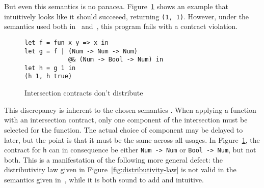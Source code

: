 \documentclass[sigplan,10pt,review,anonymous]{acmart}
\newcommand{\nickel}[1]{\lstinline[language=nickel]{#1}}
\begin{document}
But even this semantics is no panacea. Figure~\ref{fig:intersection-distribution}
shows an example that intuitively looks like it should succeeed, returning
\nickel{(1, 1)}. However, under the semantics used both
in~\cite{KeilThiemannUnionIntersection} and~\cite{RootCauseOfBlame}, this program
fails with a contract violation.

%
%
%

\begin{figure}[h]
\begin{lstlisting}[language=nickel]
let f = fun x y => x in
let g = f | (Num -> Num -> Num)
            @& (Num -> Bool -> Num) in
let h = g 1 in
(h 1, h true)
\end{lstlisting}
\caption{Intersection contracts don't distribute}
\label{fig:intersection-distribution}
\end{figure}

This discrepancy is inherent to the chosen semantics .  When applying a function
with an intersection contract, only one component of the intersection must be
selected for the function. The actual choice of component may be delayed to
later, but the point is that it must be the same across all usages. In
Figure~\ref{fig:intersection-distribution}, the contract for \nickel{h} can in
consequence be either \nickel{Num -> Num} or \nickel{Bool -> Num}, but not both.
This is a manifestation of the following more general defect: the distributivity
law given in Figure~\ref{fig:distributivity-law} is not valid in the semantics
given in~\cite{KeilThiemannUnionIntersection}, while it is both sound to add and
intuitive.
\end{document}
